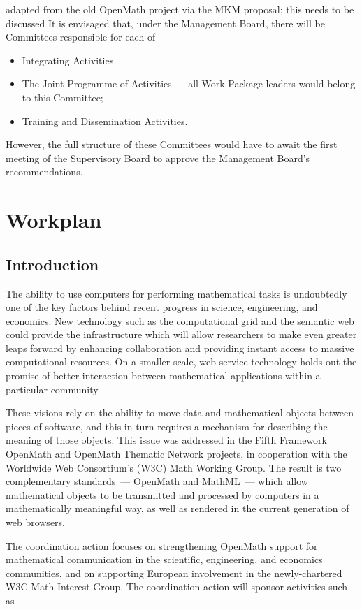 \documentclass{euproposal}
\begin{document}
\begin{newpart}{adapted from the old OpenMath project via the MKM proposal; this
    needs to be discussed}
It is envisaged that, under the Management Board, there will be
Committees responsible for each of
\begin{itemize}
\item Integrating Activities
\item The Joint Programme of Activities --- all Work Package leaders
  would belong to this Committee;
\item Training and Dissemination Activities.
\end{itemize}
However, the full structure of these Committees would have to await
the first meeting of the Supervisory Board to approve the Management
Board's recommendations.
\end{newpart}

\chapter{Workplan}\label{cha:workplan}



\section{Introduction}

The ability to use computers for performing mathematical tasks is
undoubtedly one of the key factors behind recent progress in science,
engineering, and economics.  New technology such as the computational
grid and the semantic web could provide the infrastructure which will
allow researchers to make even greater leaps forward by enhancing
collaboration and providing instant access to massive computational
resources.  On a smaller scale, web service technology holds out the
promise of better interaction between mathematical applications within
a particular community.

These visions rely on the ability to move data and mathematical
objects between pieces of software, and this in turn requires a
mechanism for describing the meaning of those objects.  This issue was
addressed in the Fifth Framework OpenMath and OpenMath Thematic
Network projects, in cooperation with the Worldwide Web Consortium's
(W3C) Math Working Group.  The result is two complementary
standards~--- OpenMath and MathML~--- which allow mathematical objects
to be transmitted and processed by computers in a mathematically
meaningful way, as well as rendered in the current generation of web
browsers.

The coordination action focuses on strengthening OpenMath support for
mathematical communication in the scientific, engineering, and
economics communities, and on supporting European involvement in the
newly-chartered W3C Math Interest Group.  The coordination action will
sponsor activities such as
\end{document}
